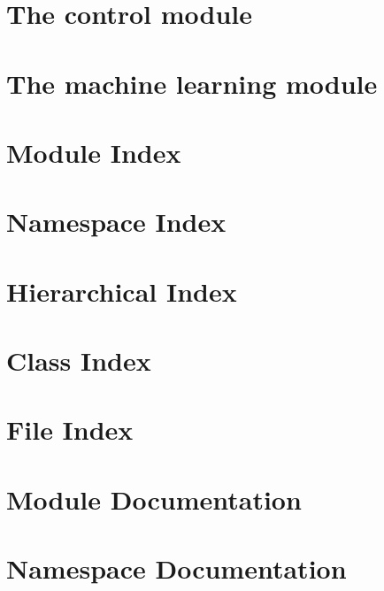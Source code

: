 \documentclass[twoside]{book}
\newcommand{\+}{\discretionary{\mbox{\scriptsize$\hookleftarrow$}}{}{}}
\begin{document}
\chapter{The control module}
\label{controlpage}
\hypertarget{controlpage}{}

\chapter{The machine learning module}
\label{mlpage}
\hypertarget{mlpage}{}

\chapter{Module Index}

\chapter{Namespace Index}

\chapter{Hierarchical Index}

\chapter{Class Index}

\chapter{File Index}

\chapter{Module Documentation}




\chapter{Namespace Documentation}

\end{document}

